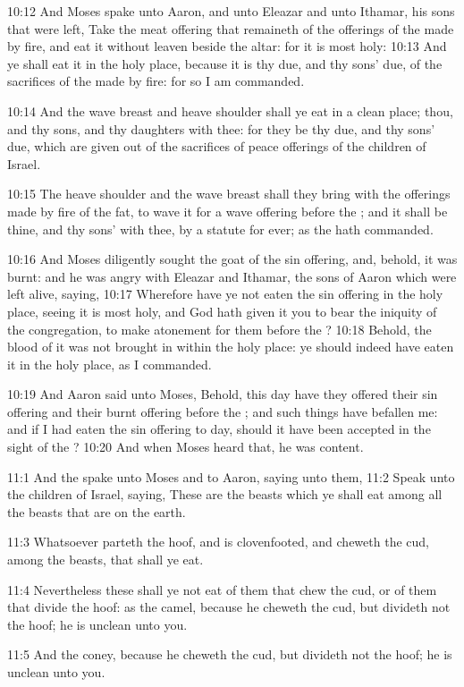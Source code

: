 10:12 And Moses spake unto Aaron, and unto Eleazar and unto Ithamar,
his sons that were left, Take the meat offering that remaineth of the
offerings of the \LORD made by fire, and eat it without leaven beside
the altar: for it is most holy: 10:13 And ye shall eat it in the holy
place, because it is thy due, and thy sons' due, of the sacrifices of
the \LORD made by fire: for so I am commanded.

10:14 And the wave breast and heave shoulder shall ye eat in a clean
place; thou, and thy sons, and thy daughters with thee: for they be
thy due, and thy sons' due, which are given out of the sacrifices of
peace offerings of the children of Israel.

10:15 The heave shoulder and the wave breast shall they bring with the
offerings made by fire of the fat, to wave it for a wave offering
before the \LORD; and it shall be thine, and thy sons' with thee, by a
statute for ever; as the \LORD hath commanded.

10:16 And Moses diligently sought the goat of the sin offering, and,
behold, it was burnt: and he was angry with Eleazar and Ithamar, the
sons of Aaron which were left alive, saying, 10:17 Wherefore have ye
not eaten the sin offering in the holy place, seeing it is most holy,
and God hath given it you to bear the iniquity of the congregation, to
make atonement for them before the \LORD?  10:18 Behold, the blood of
it was not brought in within the holy place: ye should indeed have
eaten it in the holy place, as I commanded.

10:19 And Aaron said unto Moses, Behold, this day have they offered
their sin offering and their burnt offering before the \LORD; and such
things have befallen me: and if I had eaten the sin offering to day,
should it have been accepted in the sight of the \LORD?  10:20 And when
Moses heard that, he was content.

11:1 And the \LORD spake unto Moses and to Aaron, saying unto them,
11:2 Speak unto the children of Israel, saying, These are the beasts
which ye shall eat among all the beasts that are on the earth.

11:3 Whatsoever parteth the hoof, and is clovenfooted, and cheweth the
cud, among the beasts, that shall ye eat.

11:4 Nevertheless these shall ye not eat of them that chew the cud, or
of them that divide the hoof: as the camel, because he cheweth the
cud, but divideth not the hoof; he is unclean unto you.

11:5 And the coney, because he cheweth the cud, but divideth not the
hoof; he is unclean unto you.

